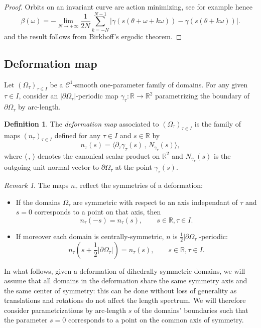 \documentclass[12pt, openany]{amsart}
\theoremstyle{definition}
\newtheorem{definition}[theorem]{Definition}
\theoremstyle{remark}
\theoremstyle{remark}
\newtheorem{remark}[theorem]{Remark}
\theoremstyle{theorem}
\theoremstyle{theorem}
\theoremstyle{theorem}
\theoremstyle{theorem}
\newcommand{\RR}{\mathbb{R}}
\begin{document}
\begin{proof}
Orbits on an invariant curve are action minimizing, see for example \cite{FierobeSorrentino, ForniMather} hence 
\[
\beta(\omega) = -\lim_{N\to+\infty} \frac{1}{2N}\sum_{k=-N}^{N-1} |\gamma(s(\theta+\omega+k\omega)) - \gamma(s(\theta+k\omega))|.
\]
and the result follows from Birkhoff's ergodic theorem.
\end{proof}


\subsection{Deformation map}

Let $(\Omega_{\tau})_{\tau\in I}$ be a $\mathscr C^1$-smooth one-parameter family of domains. For any given $\tau\in I$, consider an $|\partial\Omega_{\tau}|$-periodic map $\gamma_{\tau}:\RR\to\RR^2$ parametrizing the boundary of $\partial\Omega_{\tau}$ by arc-length.

\begin{definition}
The \textit{deformation map} associated to $(\Omega_{\tau})_{\tau\in I}$ is the family of maps $(n_{\tau})_{\tau\in I}$ defined for any $\tau\in I$ and $s\in\RR$ by
\begin{equation} \label{defntau}
n_{\tau}(s) = \langle\partial_{\tau}\gamma_{\tau}(s)\,,\,N_{\gamma_{\tau}}(s)\rangle,
\end{equation}
where $\langle\,,\,\rangle$ denotes the canonical scalar product on $\RR^2$ and $N_{\gamma_{\tau}}(s)$ is the outgoing unit normal vector to $\partial\Omega_{\tau}$ at the point $\gamma_{\tau}(s)$. 
\end{definition}

\begin{remark}
\label{remark:symmetry_n}
The maps $n_{\tau}$ reflect the symmetries of a deformation:
\begin{itemize}
\item If the domains $\Omega_{\tau}$ are symmetric with respect to an axis independant of $\tau$ and $s=0$ corresponds to a point on that axis, then 
\[
n_{\tau}(-s)=n_{\tau}(s),\qquad s\in\RR,\tau\in I.
\]
\item If moreover each domain is centrally-symmetric, $n$ is $\frac{1}{2}|\partial \Omega_{\tau}|$-periodic:
\[
n_{\tau}\left(s+\frac{1}{2}|\partial \Omega_{\tau}|\right)=n_{\tau}(s),\qquad s\in\RR,\tau\in I.
\]
\end{itemize}
In what follows, given a deformation of dihedrally symmetric domains, we will assume that all domains in the deformation share the same symmetry axis and the same center of symmetry: this can be done without loss of generality as translations and rotations do not affect the length spectrum. We will therefore consider parametrizations by arc-length $s$ of the domains' boundaries such that the parameter $s=0$ corresponds to a point on the common axis of symmetry.
\end{remark}
\end{document}

